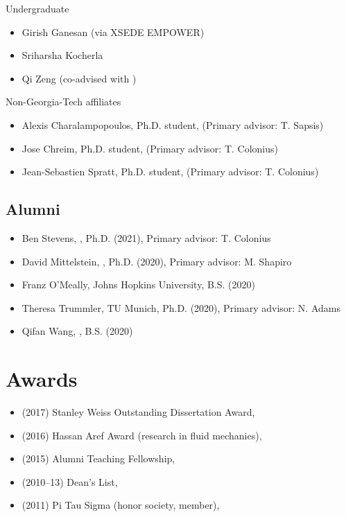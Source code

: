 Undergraduate
\begin{itemize}
    \item Girish Ganesan (via XSEDE EMPOWER)
    \item Sriharsha Kocherla
    \item Qi Zeng (co-advised with \Florian)
\end{itemize}

Non-Georgia-Tech affiliates
\begin{itemize}
    \item Alexis Charalampopoulos, Ph.D. student, \MIT (Primary advisor: T. Sapsis)
    \item Jose Chreim, Ph.D. student, \CIT (Primary advisor: T. Colonius)
    \item Jean-Sebastien Spratt, Ph.D. student, \CIT (Primary advisor: T. Colonius)
\end{itemize}

\subsection{Alumni}

\begin{itemize}
    \item Ben Stevens, \CIT, Ph.D. (2021), Primary advisor: T. Colonius
    \item David Mittelstein, \CIT, Ph.D. (2020), Primary advisor: M. Shapiro
    \item Franz O'Meally, Johns Hopkins University, B.S. (2020)
    \item Theresa Trummler, TU Munich, Ph.D. (2020), Primary advisor: N. Adams
    \item Qifan Wang, \CIT, B.S. (2020)
\end{itemize}

\section{Awards}

\begin{itemize}
    \item (2017) Stanley Weiss Outstanding Dissertation Award, \UIUC
    \item (2016) Hassan Aref Award (research in fluid mechanics), \UIUC
    \item (2015) Alumni Teaching Fellowship, \UIUC
    \item (2010--13) Dean's List, \UMD
    \item (2011) Pi Tau Sigma (honor society, member), \UMD
\end{itemize}

